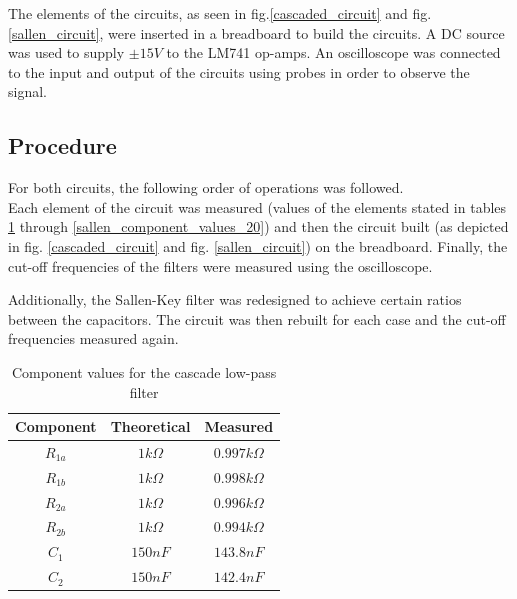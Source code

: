 \documentclass{scrartcl}
\begin{document}
The elements of the circuits, as seen in fig.\ref{cascaded_circuit} and fig.\ref{sallen_circuit}, were inserted in a breadboard to build the circuits. A DC source was used to supply $\pm15 V$ to the LM741 op-amps. An oscilloscope was connected to the input and output of the circuits using probes in order to observe the signal.


\subsection{Procedure}

For both circuits, the following order of operations was followed.\\
Each element of the circuit was measured (values of the elements stated in tables \ref{cascade_component_values} through \ref{sallen_component_values_20}) and then the circuit built (as depicted in fig. \ref{cascaded_circuit} and fig. \ref{sallen_circuit}) on the breadboard. Finally, the cut-off frequencies of the filters were measured using the oscilloscope.

Additionally, the Sallen-Key filter was redesigned to achieve certain ratios between the capacitors. The circuit was then rebuilt for each case and the cut-off frequencies measured again.

\begin{table}[H]
    \centering
    \begin{tabular}{|c|c|c|} \hline
        \textbf{Component} & \textbf{Theoretical} & \textbf{Measured} \\ \hline
        $R_{1a}$ & $1k\Omega$ & $0.997k\Omega$ \\ \hline
        $R_{1b}$ & $1k\Omega$ & $0.998k\Omega$ \\ \hline
        $R_{2a}$ & $1k\Omega$ & $0.996k\Omega$ \\ \hline
        $R_{2b}$ & $1k\Omega$ & $0.994k\Omega$ \\ \hline
		$C_1$ & $150nF$ & $143.8nF$ \\ \hline
		$C_2$ & $150nF$ & $142.4nF$ \\ \hline
		
    \end{tabular}
    \caption{Component values for the cascade low-pass filter}
    \label{cascade_component_values}
\end{table}
\end{document}
